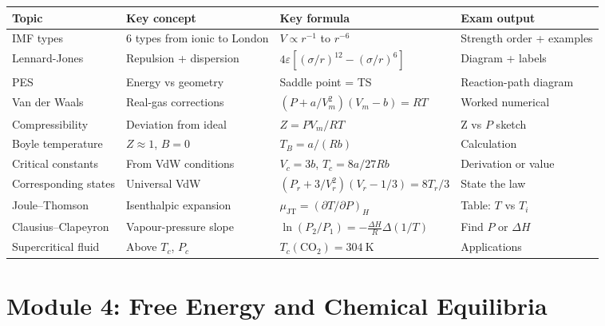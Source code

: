 \documentclass[12pt,a4paper]{article}
\newcommand{\moduletitle}{Combined Notes}
\begin{document}
\begin{tcolorbox}[tikzbox, title={Summary Reference Table --- Module 3}]
\begin{tabularx}{\linewidth}{|B{2.8cm}|Y|Y|Y|}
\hline
\textbf{Topic} & \textbf{Key concept} & \textbf{Key formula} & \textbf{Exam output} \\
\hline
IMF types & 6 types from ionic to London & $V \propto r^{-1}$ to $r^{-6}$ & Strength order + examples \\
\hline
Lennard-Jones & Repulsion + dispersion & $4\varepsilon[(\sigma/r)^{12}-(\sigma/r)^6]$ & Diagram + labels \\
\hline
PES & Energy vs geometry & Saddle point = TS & Reaction-path diagram \\
\hline
Van der Waals & Real-gas corrections & $(P+a/V_m^2)(V_m-b)=RT$ & Worked numerical \\
\hline
Compressibility & Deviation from ideal & $Z=PV_m/RT$ & Z vs $P$ sketch \\
\hline
Boyle temperature & $Z\approx1$, $B=0$ & $T_B=a/(Rb)$ & Calculation \\
\hline
Critical constants & From VdW conditions & $V_c=3b$, $T_c=8a/27Rb$ & Derivation or value \\
\hline
Corresponding states & Universal VdW & $(P_r+3/V_r^2)(V_r-1/3)=8T_r/3$ & State the law \\
\hline
Joule--Thomson & Isenthalpic expansion & $\mu_{\mathrm{JT}}=(\partial T/\partial P)_H$ & Table: $T$ vs $T_i$ \\
\hline
Clausius--Clapeyron & Vapour-pressure slope & $\ln(P_2/P_1)=-\frac{\Delta H}{R}\Delta(1/T)$ & Find $P$ or $\Delta H$ \\
\hline
Supercritical fluid & Above $T_c$, $P_c$ & $T_c(\mathrm{CO_2})=304\ \mathrm{K}$ & Applications \\
\hline
\end{tabularx}
\end{tcolorbox}

\newpage
\renewcommand{\moduletitle}{Module 4 --- Free Energy and Equilibria}
\part{Module 4: Free Energy and Chemical Equilibria}
\setcounter{section}{0}

\end{document}
